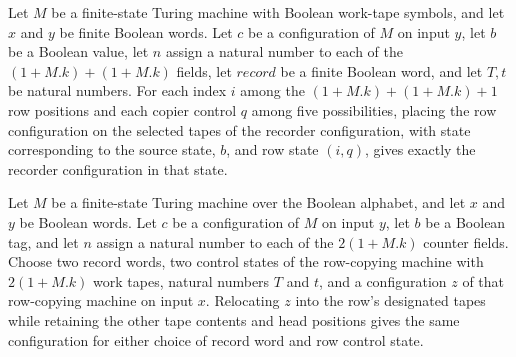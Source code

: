 \begin{lemma}
\label{Complexity.clRec_row_frame}
\leanok
{}
Let $M$ be a finite-state Turing machine with Boolean work-tape symbols, and let $x$ and
$y$ be finite Boolean words. Let $c$ be a configuration of $M$ on input $y$, let $b$ be
a Boolean value, let $n$ assign a natural number to each of the $(1+M.k)+(1+M.k)$
fields, let $record$ be a finite Boolean word, and let $T,t$ be natural numbers. For
each index $i$ among the $(1+M.k)+(1+M.k)+1$ row positions and each copier control $q$
among five possibilities, placing the row configuration on the selected tapes of the
recorder configuration, with state corresponding to the source state, $b$, and row state
$(i,q)$, gives exactly the recorder configuration in that state.
\end{lemma}

\begin{lemma}
\label{Complexity.clRec_row_inactive}
\leanok
{}
Let $M$ be a finite-state Turing machine over the Boolean alphabet, and let $x$ and $y$
be Boolean words. Let $c$ be a configuration of $M$ on input $y$, let $b$ be a Boolean
tag, and let $n$ assign a natural number to each of the $2(1+M.k)$ counter fields.
Choose two record words, two control states of the row-copying machine with $2(1+M.k)$
work tapes, natural numbers $T$ and $t$, and a configuration $z$ of that row-copying
machine on input $x$. Relocating $z$ into the row's designated tapes while retaining the
other tape contents and head positions gives the same configuration for either choice of
record word and row control state.
\end{lemma}

